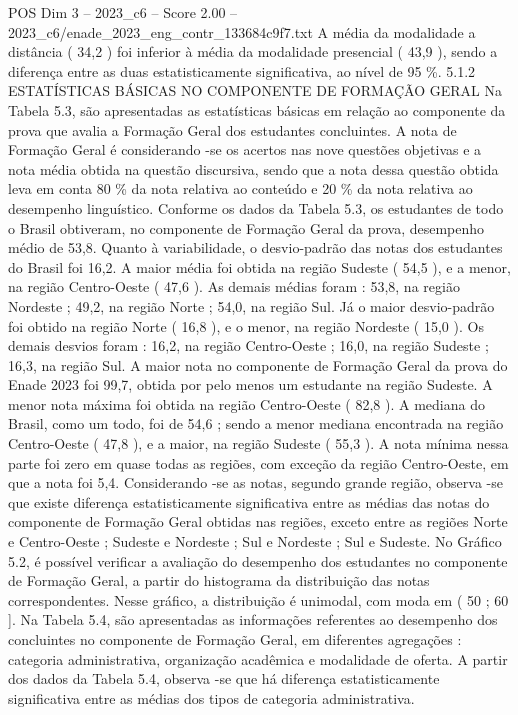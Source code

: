 \begin{textsample}{POS Dim 3 – 2023\_c6 – Score 2.00 – 2023\_c6/enade\_2023\_eng\_contr\_133684c9f7.txt}
A média da modalidade a distância ( 34,2 ) foi inferior à média da modalidade presencial ( 43,9 ), sendo a diferença entre as duas estatisticamente significativa, ao nível de 95 \%. 5.1.2 ESTATÍSTICAS BÁSICAS NO COMPONENTE DE FORMAÇÃO GERAL Na Tabela 5.3, são apresentadas as estatísticas básicas em relação ao componente da prova que avalia a Formação Geral dos estudantes concluintes.
A nota de Formação Geral é considerando -se os acertos nas nove questões objetivas e a nota média obtida na questão discursiva, sendo que a nota dessa questão obtida leva em conta 80 \% da nota relativa ao conteúdo e 20 \% da nota relativa ao desempenho linguístico.
Conforme os dados da Tabela 5.3, os estudantes de todo o Brasil obtiveram, no componente de Formação Geral da prova, desempenho médio de 53,8.
Quanto à variabilidade, o desvio-padrão das notas dos estudantes do Brasil foi 16,2.
A maior média foi obtida na região Sudeste ( 54,5 ), e a menor, na região Centro-Oeste ( 47,6 ).
As demais médias foram : 53,8, na região Nordeste ; 49,2, na região Norte ; 54,0, na região Sul.
Já o maior desvio-padrão foi obtido na região Norte ( 16,8 ), e o menor, na região Nordeste ( 15,0 ).
Os demais desvios foram : 16,2, na região Centro-Oeste ; 16,0, na região Sudeste ; 16,3, na região Sul.
A maior nota no componente de Formação Geral da prova do Enade 2023 foi 99,7, obtida por pelo menos um estudante na região Sudeste.
A menor nota máxima foi obtida na região Centro-Oeste ( 82,8 ).
A mediana do Brasil, como um todo, foi de 54,6 ; sendo a menor mediana encontrada na região Centro-Oeste ( 47,8 ), e a maior, na região Sudeste ( 55,3 ).
A nota mínima nessa parte foi zero em quase todas as regiões, com exceção da região Centro-Oeste, em que a nota foi 5,4.
Considerando -se as notas, segundo grande região, observa -se que existe diferença estatisticamente significativa entre as médias das notas do componente de Formação Geral obtidas nas regiões, exceto entre as regiões Norte e Centro-Oeste ; Sudeste e Nordeste ; Sul e Nordeste ; Sul e Sudeste.
No Gráfico 5.2, é possível verificar a avaliação do desempenho dos estudantes no componente de Formação Geral, a partir do histograma da distribuição das notas correspondentes.
Nesse gráfico, a distribuição é unimodal, com moda em ( 50 ; 60 ].
Na Tabela 5.4, são apresentadas as informações referentes ao desempenho dos concluintes no componente de Formação Geral, em diferentes agregações : categoria administrativa, organização acadêmica e modalidade de oferta.
A partir dos dados da Tabela 5.4, observa -se que há diferença estatisticamente significativa entre as médias dos tipos de categoria administrativa.

\end{textsample}
